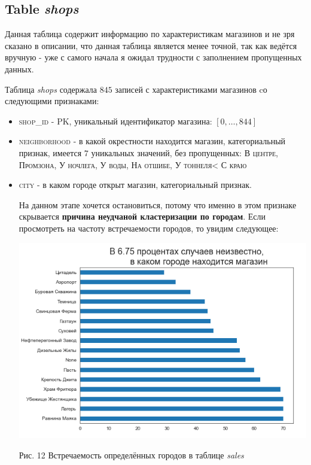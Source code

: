 \documentclass[%
10pt, %
final, %
oneside, %
onecolumn, %
centertags]{article} %
\theoremstyle{plain}
\theoremstyle{definition}
\theoremstyle{remark}
\begin{document}
\subsection{Table \textit{shops}}

Данная таблица содержит информацию по характеристикам магазинов и не зря сказано в описании, что данная таблица является менее точной, так как ведётся вручную - уже с самого начала я ожидал трудности с заполнением пропущенных данных. 

Таблица \textit{shops} содержала $845$ записей с характеристиками магазинов cо следующими признаками:

\begin{itemize}
	\item \textsc{shop\_id} - PK, уникальный идентификатор магазина: $[0, \ldots, 844]$
	\item \textsc{neighborhood} - в какой окрестности находится магазин, категориальный признак, имеется $7$ уникальных значений, без пропущенных: \textsc{В центре, Промзона, У ночлега, У воды, На отшибе, У тоннеля< С краю}
	\item \textsc{city} - в каком городе открыт магазин, категориальный признак.

	На данном этапе хочется остановиться, потому что именно в этом признаке скрывается \textbf{причина неудчаной кластеризации по городам}. Если просмотреть на частоту встречаемости городов, то увидим следующее:
	\begin{center}
	\includegraphics[scale=0.5]{12.png}

 	Рис. 12 Встречаемость определённых городов в таблице \textit{sales}
	\end{center}


\end{itemize}
\end{document}
